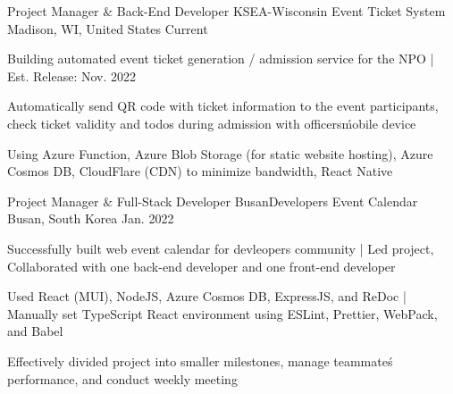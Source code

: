 

\begin{cventries}

  \cventry
  {Project Manager \& Back-End Developer} %
  {KSEA-Wisconsin Event Ticket System} %
  {Madison, WI, United States} %
  {Current} %
  {
    \begin{cvitems} %
      \item {Building automated event ticket generation / admission service for the NPO | Est. Release: Nov. 2022}
      \item {Automatically send QR code with ticket information to the event participants, check ticket validity and todos during admission with officers\' mobile device}
      \item {Using Azure Function, Azure Blob Storage (for static website hosting), Azure Cosmos DB, CloudFlare (CDN) to minimize bandwidth, React Native}
    \end{cvitems}
  }
  
  \cventry
  {Project Manager \& Full-Stack Developer} %
  {BusanDevelopers Event Calendar} %
  {Busan, South Korea} %
  {Jan. 2022} %
  {
    \begin{cvitems} %
      \item {Successfully built web event calendar for devleopers community | Led project, Collaborated with one back-end developer and one front-end developer}
      \item {Used React (MUI), NodeJS, Azure Cosmos DB, ExpressJS, and ReDoc | Manually set TypeScript React environment using ESLint, Prettier, WebPack, and Babel}
      \item {Effectively divided project into smaller milestones, manage teammate\'s performance, and conduct weekly meeting}
    \end{cvitems}
  }
  

\end{cventries}
